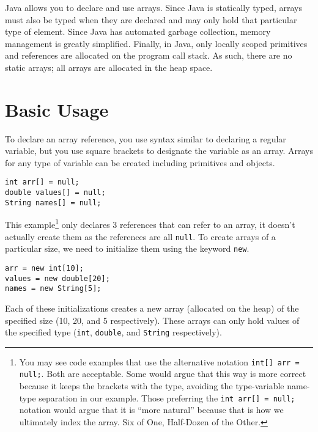 

Java allows you to declare and use arrays.  Since Java is statically
typed, arrays must also be typed when they are declared and
may only hold that particular type of element.  Since Java has
automated garbage collection, memory management is greatly
simplified.  Finally, in Java, only locally scoped primitives and 
references are allocated on the program call stack.  As such,
there are no static arrays; all arrays are allocated in the heap
space.

\section{Basic Usage}

To declare an array reference, you use syntax similar to declaring
a regular variable, but you use square brackets to designate
the variable as an array.  Arrays for any type of variable can
be created including primitives and objects.

\begin{verbatim}
int arr[] = null;
double values[] = null;
String names[] = null;
\end{verbatim}

This example\footnote{You may see code examples that use the
alternative notation \texttt{int[] arr = null;}.  Both are
acceptable.  Some would argue that this way is more correct because
it keeps the brackets with the type, avoiding the type-variable name-type
separation in our example.  Those preferring the \texttt{int arr[] = null;}
notation would argue that it is ``more natural'' because that is how we
ultimately index the array.  Six of One, Half-Dozen of the Other.} 
only declares 3 references that can refer to an array, 
it doesn't actually create them as the references are all 
\texttt{null}.  To create arrays of a particular size, we
need to initialize them using the keyword \texttt{new}.  

\begin{verbatim}
arr = new int[10];
values = new double[20];
names = new String[5];
\end{verbatim}

Each of these initializations creates a new array (allocated on the 
heap) of the specified size (10, 20, and 5 respectively).  These 
arrays can only hold values of the specified type (\texttt{int},
\texttt{double}, and \texttt{String} respectively).

